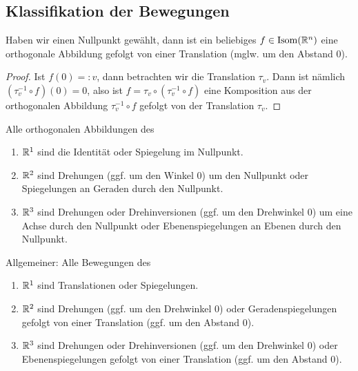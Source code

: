 \subsection{Klassifikation der Bewegungen}

\begin{lemma}
Haben wir einen Nullpunkt gewählt, dann ist ein beliebiges $f\in\operatorname{Isom}(\mathbb{R}^n)$ eine orthogonale Abbildung gefolgt von einer Translation (mglw. um den Abstand $0$).
\end{lemma}
\begin{proof}
Ist $f(0)=:v$, dann betrachten wir die Translation $\tau_v$. Dann ist nämlich $(\tau_v^{-1}\circ f)(0) = 0$, also ist $f=\tau_v\circ(\tau_v^{-1}\circ f)$ eine Komposition aus der orthogonalen Abbildung $\tau_v^{-1}\circ f$ gefolgt von der Translation $\tau_v$.
\end{proof}

\begin{theorem}
Alle orthogonalen Abbildungen des
\begin{enumerate}
\item $\mathbb{R}^1$ sind die Identität oder Spiegelung im Nullpunkt.
\item $\mathbb{R}^2$ sind Drehungen (ggf. um den Winkel $0$) um den Nullpunkt oder Spiegelungen an Geraden durch den Nullpunkt.
\item $\mathbb{R}^3$ sind Drehungen oder Drehinversionen (ggf. um den Drehwinkel $0$) um eine Achse durch den Nullpunkt oder Ebenenspiegelungen an Ebenen durch den Nullpunkt.
\end{enumerate}

Allgemeiner: Alle Bewegungen des
\begin{enumerate}
\item $\mathbb{R}^1$ sind Translationen oder Spiegelungen.
\item $\mathbb{R}^2$ sind Drehungen (ggf. um den Drehwinkel $0$) oder Geradenspiegelungen gefolgt von einer Translation (ggf. um den Abstand $0$).
\item $\mathbb{R}^3$ sind Drehungen oder Drehinversionen (ggf. um den Drehwinkel $0$) oder Ebenenspiegelungen gefolgt von einer Translation (ggf. um den Abstand $0$).
\end{enumerate}
\end{theorem}